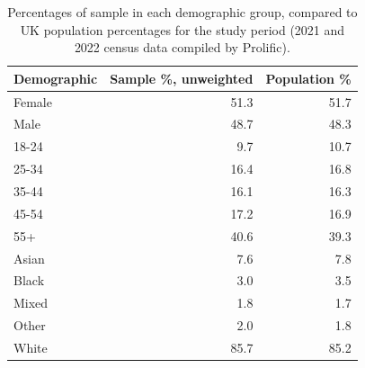 \begin{table}[ht]
\centering
\begin{tabular}{lrr}
  \hline
Demographic & Sample \%, unweighted & Population \% \\ 
  \hline
Female & 51.3 & 51.7 \\ 
  Male & 48.7 & 48.3 \\ 
   \hline
18-24 & 9.7 & 10.7 \\ 
  25-34 & 16.4 & 16.8 \\ 
  35-44 & 16.1 & 16.3 \\ 
  45-54 & 17.2 & 16.9 \\ 
  55+ & 40.6 & 39.3 \\ 
   \hline
Asian & 7.6 & 7.8 \\ 
  Black & 3.0 & 3.5 \\ 
  Mixed & 1.8 & 1.7 \\ 
  Other & 2.0 & 1.8 \\ 
  White & 85.7 & 85.2 \\ 
   \hline
\end{tabular}
\caption{Percentages of sample in each demographic
                   group, compared to UK population percentages for the study period
                   (2021 and 2022 census data compiled by Prolific).} 
\label{tab:demographics2}
\end{table}
